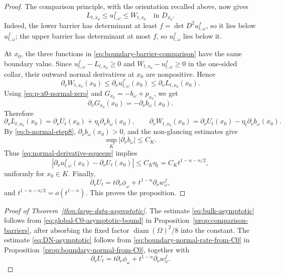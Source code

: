 \documentclass[11pt]{article}
\numberwithin{equation}{section}
\begin{document}
\begin{proof}
The comparison principle, with the orientation recalled above, now gives
\begin{equation}\label{eq:boundary-barrier-comparison}
    L_{t,x_0}\le u_{t,\omega}^f\le W_{t,x_0}
    \quad\text{in }D_{x_0}.
\end{equation}
Indeed, the lower barrier has determinant at least \(f=\det D^2u_{t,\omega}^f\), so it lies below \(u_{t,\omega}^f\); the upper barrier has determinant at most \(f\), so \(u_{t,\omega}^f\) lies below it.

At \(x_0\), the three functions in \eqref{eq:boundary-barrier-comparison} have the same boundary value.  Since \(u_{t,\omega}^f-L_{t,x_0}\ge0\) and \(W_{t,x_0}-u_{t,\omega}^f\ge0\) in the one-sided collar, their outward normal derivatives at \(x_0\) are nonpositive.  Hence
\begin{equation}\label{eq:normal-derivative-squeeze}
    \partial_\nu W_{t,x_0}(x_0)
    \le
    \partial_\nu u_{t,\omega}^f(x_0)
    \le
    \partial_\nu L_{t,x_0}(x_0).
\end{equation}
Using \eqref{eq:p-x0-normal-zero} and \(G_{x_0}=-b_\omega+p_{x_0}\), we get
\[
    \partial_\nu G_{x_0}(x_0)=-\partial_\nu b_\omega(x_0).
\]
Therefore
\[
    \partial_\nu L_{t,x_0}(x_0)
    =
    \partial_\nu U_t(x_0)
    +\eta_t\partial_\nu b_\omega(x_0),
    \qquad
    \partial_\nu W_{t,x_0}(x_0)
    =
    \partial_\nu U_t(x_0)
    -\eta_t\partial_\nu b_\omega(x_0).
\]
By \eqref{eq:b-normal-step8}, \(\partial_\nu b_\omega(x_0)>0\), and the non-glancing estimates give
\[
    \sup_K |\partial_\nu b_\omega|\le C_K .
\]
Thus \eqref{eq:normal-derivative-squeeze} implies
\[
    \left|
        \partial_\nu u_{t,\omega}^f(x_0)
        -\partial_\nu U_t(x_0)
    \right|
    \le C_K\eta_t
    =C_Kt^{1-n-n/2},
\]
uniformly for \(x_0\in K\).  Finally,
\[
    \partial_\nu U_t
    =
    t\partial_\nu\phi_\omega
    +
    t^{1-n}\partial_\nu w_\omega^f,
\]
and \(t^{1-n-n/2}=o(t^{1-n})\).  This proves the proposition.
\end{proof}

\begin{proof}[Proof of Theorem~\ref{thm:large-data-asymptotic}]
The estimate \eqref{eq:bulk-asymptotic} follows from \eqref{eq:global-C0-asymptotic-bound} in Proposition~\ref{prop:comparison-barriers}, after absorbing the fixed factor \(\operatorname{diam}(\Omega)^2/8\) into the constant.  The estimate \eqref{eq:DN-asymptotic} follows from \eqref{eq:boundary-normal-rate-from-C0} in Proposition~\ref{prop:boundary-normal-from-C0}, together with
\[
    \partial_\nu U_t
    =t\partial_\nu\phi_\omega+t^{1-n}\partial_\nu w_\omega^f .
\]
\end{proof}
\end{document}
